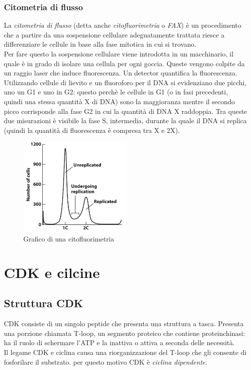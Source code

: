         \subsubsection{Citometria di flusso}
            La \textit{citometria di flusso} (detta anche \textit{citofluorimetria} o \textit{FAX}) è un procedimento che a partire da una sospensione cellulare adeguatamente trattata riesce a differenziare le cellule in base alla fase mitotica in cui si trovano.\\
            Per fare questo la sospensione cellulare viene introdotta in un macchinario, il quale è in grado di isolare una cellula per ogni goccia. Queste vengono colpite da un raggio laser che induce fluorescenza.
            Un detector quantifica la fluorescenza.\\
            Utilizzando cellule di lievito e un fluoroforo per il DNA si evidenziano due picchi, uno un G1 e uno in G2: questo perchè le cellule in G1 (o in fasi precedenti, quindi una stessa quantità X di DNA) sono la maggioranza mentre il secondo picco corrisponde alla fase G2 in cui la quantità di DNA X raddoppia.
            Tra queste due misurazioni è visibile la fase S, intermedia, durante la quale il DNA si replica (quindi la quantità di fluorescenza è compresa tra X e 2X).
            \begin{figure}[h]
                \centering
                \includegraphics[width=0.5\textwidth]{images/citofluorimetria.JPG}
                \caption{\small Grafico di una citofluorimetria}
                \label{fig:mesh1}
            \end{figure}
            

\section{CDK e cilcine}
    \subsection{Struttura CDK}
        CDK consiste di un singolo peptide che presenta una struttura a tasca.  
        Presenta una porzione chiamata T-loop, un segmento proteico che contiene proteinchinasi: ha il ruolo di schermare l'ATP e la inattiva o attiva a seconda delle necessità.\\
        Il legame CDK e ciclina causa una riorganizzazione del T-loop che gli consente di fosforilare il substrato. per questo motivo CDK è \textit{ciclina dipendente}.
    
